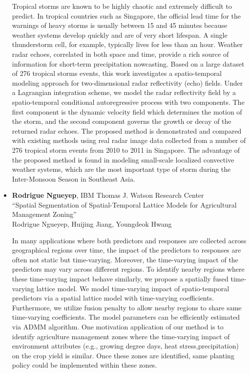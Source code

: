\begin{itemize}
Tropical storms are known to be highly chaotic and extremely difficult to predict. In tropical countries such as Singapore, the official lead time for the warnings of heavy storms is usually between 15 and 45 minutes because weather systems develop quickly and are of very short lifespan. A single thunderstorm cell, for example, typically lives for less than an hour. Weather radar echoes, correlated in both space and time, provide a rich source of information for short-term precipitation nowcasting. Based on a large dataset of 276 tropical storms events, this work investigates a spatio-temporal modeling approach for two-dimensional radar reflectivity (echo) fields. Under a Lagrangian integration scheme, we model the radar reflectivity field by a spatio-temporal conditional autoregressive process with two components. The first component is the dynamic velocity field which determines the motion of the storm, and the second component governs the growth or decay of the returned radar echoes. The proposed method is demonstrated and compared with existing methods using real radar image data collected from a number of 276 tropical storm events from 2010 to 2011 in Singapore. The advantage of the proposed method is found in modeling small-scale localized convective weather systems, which are the most important type of storm during the Inter-Monsoon Season in Southeast Asia.

\item \textbf{Rodrigue Ngueyep}, IBM Thomas J. Watson Research Center \\
``Spatial Segmentation of Spatial-Temporal Lattice Models for Agricultural Management Zoning'' \\
Rodrigue Ngueyep, Huijing Jiang, Youngdeok Hwang


In many applications where both predictors and responses are collected across geographical regions over time, the impact of the predictors to responses are often not static but time-varying. Moreover, the time-varying impact of the predictors may vary across different regions. To identify nearby regions where these time-varying impact behave similarly, we propose a spatially fused time-varying lattice model. We model time-varying impact of spatio-temporal predictors via a spatial lattice model with time-varying coefficients. Furthermore, we utilize fusion penalty to allow nearby regions to share same time-varying coefficients. The model parameters can be efficiently estimated via ADMM algorithm. One motivation application of our method is to identify agriculture management zones where the time-varying impact of environment attributes (e.g., growing degree days, heat stress,precipitation) on the crop yield is similar. Once these zones are identified, same planting policy could be implemented within these zones.

\end{itemize}

